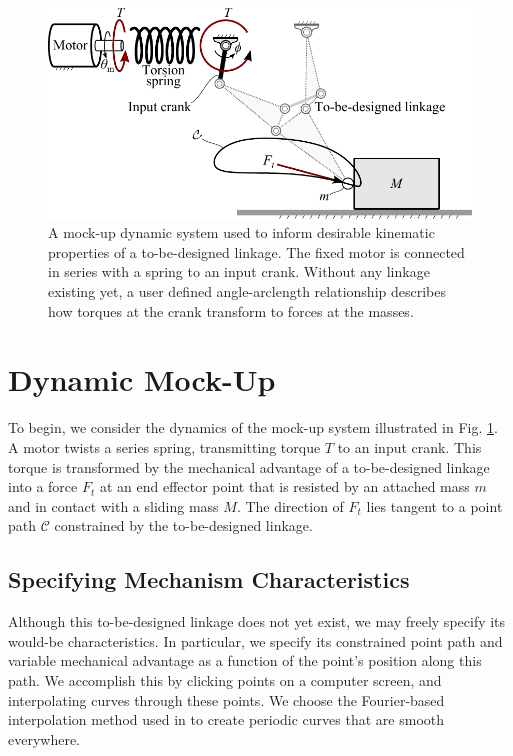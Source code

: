 \documentclass[journal]{IEEEtran}
\begin{document}
\begin{figure}[!b]
\centering
\includegraphics[width=1\linewidth]{dynamic_model}
\caption{A mock-up dynamic system used to inform desirable kinematic properties of a to-be-designed linkage.  The fixed motor is connected in series with a spring to an input crank.  Without any linkage existing yet, a user defined angle-arclength relationship describes how torques at the crank transform to forces at the masses.}
\label{dynamic_model}
\end{figure}


\section{Dynamic Mock-Up}
\label{sec:dynamic_mock-up}

To begin, we consider the dynamics of the mock-up system illustrated in Fig. \ref{dynamic_model}.
A motor twists a series spring, transmitting torque $T$ to an input crank.
This torque is transformed by the mechanical advantage of a to-be-designed linkage into a force $F_t$ at an end effector point that is resisted by an attached mass $m$ and in contact with a sliding mass $M$.
The direction of $F_t$ lies tangent to a point path $\mathcal{C}$ constrained by the to-be-designed linkage.





\subsection{Specifying Mechanism Characteristics}
\label{sec:spec_mech_char}

Although this to-be-designed linkage does not yet exist, we may freely specify its would-be characteristics.  
In particular, we specify its constrained point path and variable mechanical advantage as a function of the point's position along this path.
We accomplish this by clicking points on a computer screen, and interpolating curves through these points.
We choose the Fourier-based interpolation method used in \cite{plecnikControllingMovementTRR2016} to create periodic curves that are smooth everywhere.
\end{document}
